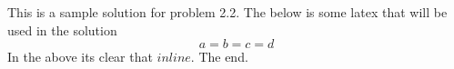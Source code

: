 This is a sample solution for problem 2.2. The below is some latex that
will be used in the solution \[a = b = c = d\] In the above its clear
that \(inline\). The end.
